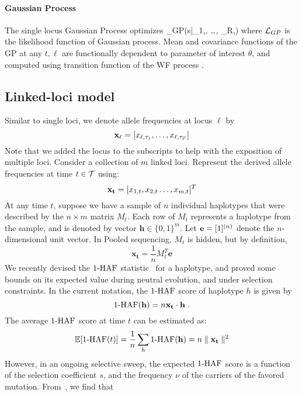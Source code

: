 \paragraph{Gaussian Process}
The single locus Gaussian Process \cite{} optimizes
\beq
\Lc_{GP}(s|\bfx_{1,\ell}, \dots, \bfx_{R,\ell})
\eeq
where ${\cal L}_{GP}$ is the likelihood function  of Gaussian process. Mean and covariance functions of the GP at any $t,\ell$ are functionally dependent to parameter of interest $\theta$, and computed using transition function of the WF process \cite{EandR-GP}.

\subsection*{Linked-loci model}
Similar to single loci, we denote allele frequencies at locus $\ell$ by
\[
{\bf x_{\ell}} = [x_{\ell,\tau_1},\ldots,x_{\ell,\tau_T}]
\]
Note that we added the locus to the subscripts to help with the
exposition of multiple loci. Consider a collection of $m$ linked
loci. Represent the derived allele frequencies at time $t\in {\cal T}$
using:
\[
{\bf x_t} = [x_{1,t},x_{2,t}\ldots,x_{m,t}]^T 
\]
At any time $t$, suppose we have a sample of $n$ individual haplotypes
that were described by the $n\times m$ matrix $M_t$. Each row of $M_t$
represents a haplotype from the sample, and is denoted by vector
$\mathbf{h} \in \{0,1\}^m$. Let ${\bf e} = [1]^{(n)}$ denote the
$n$-dimensional unit vector. In Pooled sequencing, $M_t$ is hidden,
but by definition,
\[
 \mathbf{x_t} = \frac{1}{n} M_t^T\mathbf{e}
\]
We recently devised the $1\text{-HAF}$ statistic~\cite{Ronen2015} for a
haplotype, and proved some bounds on its expected value during neutral
evolution, and under selection constraints. In the current notation,
the $1\text{-HAF}$ score of haplotype $h$ is given by
\begin{equation}
1\text{-HAF}(\mathbf{h})=n\mathbf{x_t} \cdot \mathbf{h}
\;.
\label{Seq:1-HAF_SNPmatrix}
\end{equation}
The average $1\text{-HAF}$ score at time $t$ can be estimated as:
\begin{equation}
\mathbb{E}[1\text{-HAF}(t)]=\frac{1}{n}\sum_h 1\text{-HAF}(\mathbf{h}) = n\parallel \mathbf{x_t}\parallel^2
\end{equation} 
However, in an ongoing selective sweep, the expected $1\text{-HAF}$ score is
a function of the selection coefficient $s$, and the frequency $\nu$
of the carriers of the favored mutation. From~\cite{Ronen2015}, we
find that

